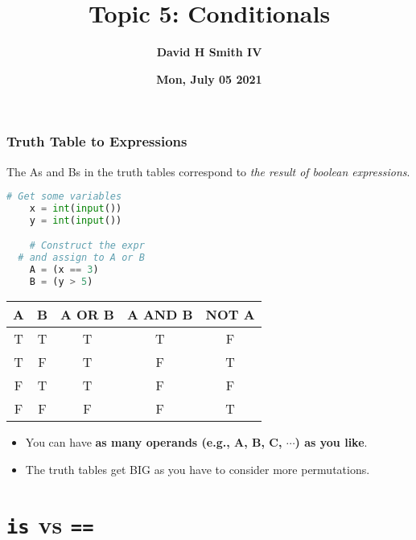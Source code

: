 \documentclass{beamer}
\title{\textbf{Topic 5: Conditionals}}
\author{\textbf{David H Smith IV}}
\institute[\textbf{UIUC}]{\textbf{University of Illinois Urbana-Champaign}}
\date{\textbf{Mon, July 05 2021}}
\begin{document}
\frame{\titlepage}

%
%
\begin{frame}[fragile]
	\frametitle{Truth Table to Expressions}
	\vfill
	The As and Bs in the truth tables correspond to \textit{the result of boolean expressions}.
	\vfill
	\begin{minipage}{0.4\textwidth}
		\begin{lstlisting}[language=Python,autogobble]
	# Get some variables 
	x = int(input())
	y = int(input())

	# Construct the expr
  # and assign to A or B
	A = (x == 3)
	B = (y > 5)
		\end{lstlisting}
	\end{minipage}
	\begin{minipage}{0.59\textwidth}
		\begin{table}[]
			\begin{tabular}{|cc|c|c|c|}
				{\color[HTML]{CD9934} \textbf{A}} & {\color[HTML]{3531FF} \textbf{B}} & \textbf{A OR B} & \textbf{A AND B} & \textbf{NOT A} \\ \hline
				{\color[HTML]{CD9934} T}          & {\color[HTML]{3531FF} T}          & T               & T                & F              \\
				{\color[HTML]{CD9934} T}          & {\color[HTML]{3531FF} F}          & T               & F                & T              \\
				{\color[HTML]{CD9934} F}          & {\color[HTML]{3531FF} T}          & T               & F                & F              \\
				{\color[HTML]{CD9934} F}          & {\color[HTML]{3531FF} F}          & F               & F                & T             
			\end{tabular}
		\end{table}
	\end{minipage}
	\vfill
	\begin{itemize}
		\item You can have \textbf{as many operands (e.g., A, B, C, $\cdots$) as you like}.
		\item The truth tables get BIG as you have to consider more permutations.
	\end{itemize}
\end{frame}

\section{\lstinline|is| vs \lstinline|==|}
\end{document}
